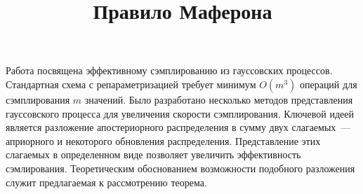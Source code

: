 \documentclass[12pt, twoside]{article}
\begin{document}
\title{\textbf{Правило Маферона}}
\date{}
\maketitle


Работа посвящена эффективному сэмплированию из гауссовских процессов. Стандартная схема с репараметризацией требует минимум $O(m^3)$ операций для сэмплирования $m$ значений. Было разработано несколько методов представления гауссовского процесса для увеличения скорости сэмплирования. Ключевой идеей является разложение апостериорного распределения в сумму двух слагаемых~---априорного и некоторого обновления распределения. Представление этих слагаемых в определенном виде позволяет увеличить эффективность сэмлирования. Теоретическим обоснованием возможности подобного разложения служит предлагаемая к рассмотрению теорема.  
\end{document}
